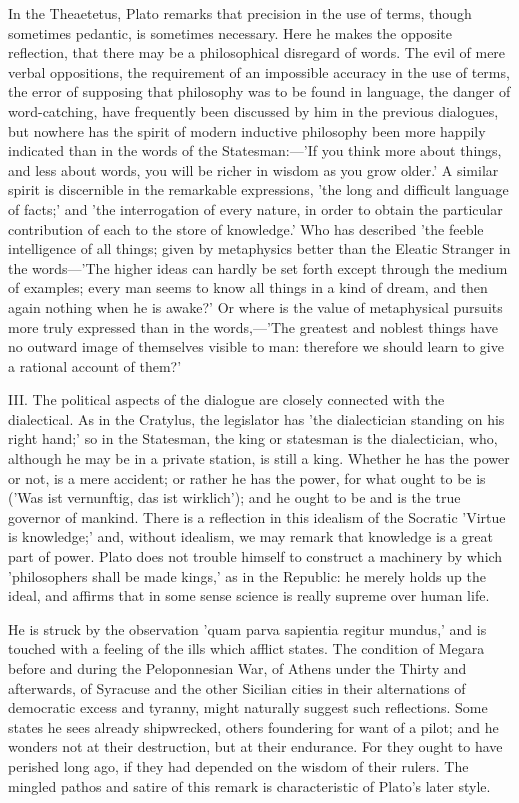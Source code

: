 \documentclass[11pt,letter]{article}
\begin{document}
\par  In the Theaetetus, Plato remarks that precision in the use of terms, though sometimes pedantic, is sometimes necessary. Here he makes the opposite reflection, that there may be a philosophical disregard of words. The evil of mere verbal oppositions, the requirement of an impossible accuracy in the use of terms, the error of supposing that philosophy was to be found in language, the danger of word-catching, have frequently been discussed by him in the previous dialogues, but nowhere has the spirit of modern inductive philosophy been more happily indicated than in the words of the Statesman:—'If you think more about things, and less about words, you will be richer in wisdom as you grow older.' A similar spirit is discernible in the remarkable expressions, 'the long and difficult language of facts;' and 'the interrogation of every nature, in order to obtain the particular contribution of each to the store of knowledge.' Who has described 'the feeble intelligence of all things; given by metaphysics better than the Eleatic Stranger in the words—'The higher ideas can hardly be set forth except through the medium of examples; every man seems to know all things in a kind of dream, and then again nothing when he is awake?' Or where is the value of metaphysical pursuits more truly expressed than in the words,—'The greatest and noblest things have no outward image of themselves visible to man: therefore we should learn to give a rational account of them?'

\par  III. The political aspects of the dialogue are closely connected with the dialectical. As in the Cratylus, the legislator has 'the dialectician standing on his right hand;' so in the Statesman, the king or statesman is the dialectician, who, although he may be in a private station, is still a king. Whether he has the power or not, is a mere accident; or rather he has the power, for what ought to be is ('Was ist vernunftig, das ist wirklich'); and he ought to be and is the true governor of mankind. There is a reflection in this idealism of the Socratic 'Virtue is knowledge;' and, without idealism, we may remark that knowledge is a great part of power. Plato does not trouble himself to construct a machinery by which 'philosophers shall be made kings,' as in the Republic: he merely holds up the ideal, and affirms that in some sense science is really supreme over human life.

\par  He is struck by the observation 'quam parva sapientia regitur mundus,' and is touched with a feeling of the ills which afflict states. The condition of Megara before and during the Peloponnesian War, of Athens under the Thirty and afterwards, of Syracuse and the other Sicilian cities in their alternations of democratic excess and tyranny, might naturally suggest such reflections. Some states he sees already shipwrecked, others foundering for want of a pilot; and he wonders not at their destruction, but at their endurance. For they ought to have perished long ago, if they had depended on the wisdom of their rulers. The mingled pathos and satire of this remark is characteristic of Plato's later style.
\end{document}
